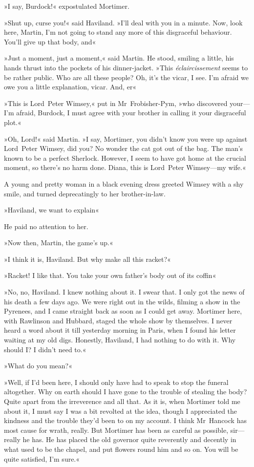 »I say, Burdock!« expostulated Mortimer.

»Shut up, curse you!« said Haviland. »I'll deal with you in a minute. Now, look here, Martin, I'm not going to stand any more of this disgraceful behaviour. You'll give up that body, and\longdash«

»Just a moment, just a moment,« said Martin. He stood, smiling a little, his hands thrust into the pockets of his dinner-jacket. »This \textit{éclaircissement} seems to be rather public. Who are all these people? Oh, it's the vicar, I see. I'm afraid we owe you a little explanation, vicar. And, er\longdash«

»This is Lord~Peter Wimsey,« put in Mr~Frobisher-Pym, »who discovered your—I'm afraid, Burdock, I must agree with your brother in calling it your disgraceful plot.«

»Oh, Lord!« said Martin. »I say, Mortimer, you didn't know you were up against Lord~Peter Wimsey, did you? No wonder the cat got out of the bag. The man's known to be a perfect Sherlock. However, I seem to have got home at the crucial moment, so there's no harm done. Diana, this is Lord~Peter Wimsey—my wife.«

A young and pretty woman in a black evening dress greeted Wimsey with a shy smile, and turned deprecatingly to her brother-in-law.

»Haviland, we want to explain\longdash«

He paid no attention to her.

»Now then, Martin, the game's up.«

»I think it is, Haviland. But why make all this racket?«

»Racket! I like that. You take your own father's body out of its coffin\longdash«

»No, no, Haviland. I knew nothing about it. I swear that. I only got the news of his death a few days ago. We were right out in the wilds, filming a show in the Pyrenees, and I came straight back as soon as I could get away. Mortimer here, with Rawlinson and Hubbard, staged the whole show by themselves. I never heard a word about it till yesterday morning in Paris, when I found his letter waiting at my old digs. Honestly, Haviland, I had nothing to do with it. Why should I? I didn't need to.«

»What do you mean?«

»Well, if I'd been here, I should only have had to speak to stop the funeral altogether. Why on earth should I have gone to the trouble of stealing the body? Quite apart from the irreverence and all that. As it is, when Mortimer told me about it, I must say I was a bit revolted at the idea, though I appreciated the kindness and the trouble they'd been to on my account. I think Mr~Hancock has most cause for wrath, really. But Mortimer has been as careful as possible, sir—really he has. He has placed the old governor quite reverently and decently in what used to be the chapel, and put flowers round him and so on. You will be quite satisfied, I'm sure.«


